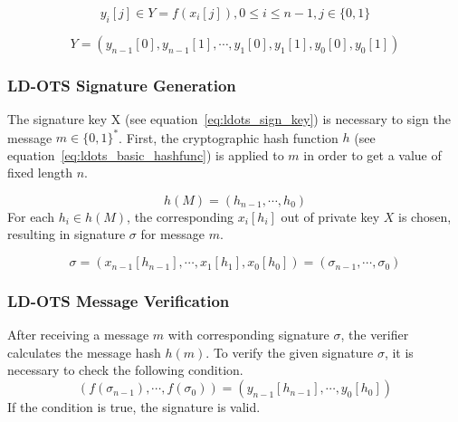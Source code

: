 \begin{equation}
y_i[j] \in Y = f(x_i[j]), 0 \leq i \leq n-1, j \in \lbrace 0,1 \rbrace
\end{equation}

\begin{equation}
Y = \left( 
y_{n-1}\left[0\right], y_{n-1}\left[1 \right], \cdots, y_{1}\left[0\right], y_{1}\left[1\right], y_{0}\left[0\right], y_{0}\left[1\right]
\right)
\end{equation}

\subsubsection{LD-OTS Signature Generation} %
The signature key X (see equation~\ref{eq:ldots_sign_key}) is necessary to sign the message $m \in \lbrace 0,1 \rbrace^*$. 
First, the cryptographic hash function $h$ (see equation~\ref{eq:ldots_basic_hashfunc}) is applied to $m$ in order to get a value of fixed length $n$.

\begin{equation}
\label{eq:ldots_hash_message}
h(M)=(h_{n-1}, \cdots, h_{0})
\end{equation}
For each $h_i \in h(M)$, the corresponding $x_i[h_i]$ out of private key $X$ is chosen, resulting in signature $\sigma$ for message $m$.

\begin{equation}
\sigma = \left(
x_{n-1} \left[ h_{n-1} \right], \cdots, x_1\left[ h_1 \right], x_0\left[ h_0\right]
\right) = (\sigma_{n-1}, \cdots, \sigma_0)
\end{equation}

\subsubsection{LD-OTS Message Verification}
After receiving a message $m$ with corresponding signature $\sigma$, the verifier calculates the message hash $h(m)$. 
To verify the given signature $\sigma$, it is necessary to check the following condition.
\begin{equation}
\left(
f(\sigma_{n-1}), \cdots, f(\sigma_0)
\right) =
\left(
y_{n-1}[h_{n-1}], \cdots, y_0[h_0]
\right)
\end{equation}
If the condition is true, the signature is valid.


